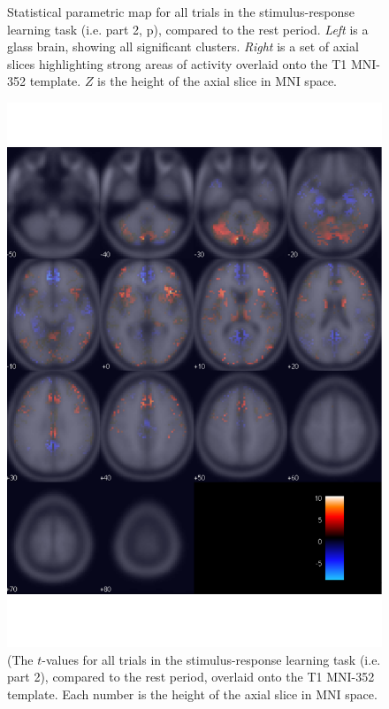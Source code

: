 \documentclass[doc,12pt]{apa}        %
\begin{document}
\begin{figure}[tp]
    \centering
    \caption{Statistical parametric map for all trials in the stimulus-response learning task (i.e. part 2, p\pageref{subsub:whatwhen}), compared to the rest period.  \emph{Left} is a glass brain, showing all significant clusters.  \emph{Right} is a set of axial slices highlighting strong areas of activity overlaid onto the T1 MNI-352 template.  $Z$ is the height of the axial slice in MNI space.}
	\label{fig:gl}
\end{figure}

\begin{figure}[tp]
	\includegraphics{f_map_gl_raw_t}
    \centering
	\caption{(The $t$-values for all trials in the stimulus-response learning task (i.e. part 2), compared to the rest period,  overlaid onto the T1 MNI-352 template.   Each number is the height of the axial slice in MNI space.}
	\label{fig:glraw}
\end{figure}
\end{document}
